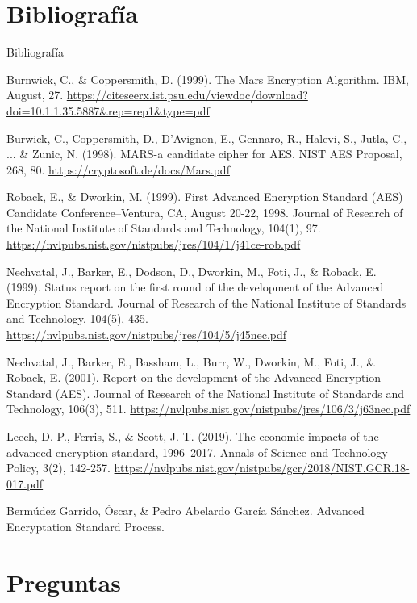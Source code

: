 \documentclass{beamer}
\begin{document}
\section{Bibliografía}
\begin{frame}[allowframebreaks]{Bibliografía}

\scriptsize
\begin{thebibliography}{9}


	Burnwick, C., \& Coppersmith, D. (1999). The Mars Encryption Algorithm. IBM, August, 27. \url{https://citeseerx.ist.psu.edu/viewdoc/download?doi=10.1.1.35.5887&rep=rep1&type=pdf}


	Burwick, C., Coppersmith, D., D’Avignon, E., Gennaro, R., Halevi, S., Jutla, C., ... \& Zunic, N. (1998). MARS-a candidate cipher for AES. NIST AES Proposal, 268, 80. \url{https://cryptosoft.de/docs/Mars.pdf}


	Roback, E., \& Dworkin, M. (1999). First Advanced Encryption Standard (AES) Candidate Conference--Ventura, CA, August 20-22, 1998. Journal of Research of the National Institute of Standards and Technology, 104(1), 97. \url{https://nvlpubs.nist.gov/nistpubs/jres/104/1/j41ce-rob.pdf}


	Nechvatal, J., Barker, E., Dodson, D., Dworkin, M., Foti, J., \& Roback, E. (1999). Status report on the first round of the development of the Advanced Encryption Standard. Journal of Research of the National Institute of Standards and Technology, 104(5), 435. \url{https://nvlpubs.nist.gov/nistpubs/jres/104/5/j45nec.pdf}


	Nechvatal, J., Barker, E., Bassham, L., Burr, W., Dworkin, M., Foti, J., \& Roback, E. (2001). Report on the development of the Advanced Encryption Standard (AES). Journal of Research of the National Institute of Standards and Technology, 106(3), 511. \url{https://nvlpubs.nist.gov/nistpubs/jres/106/3/j63nec.pdf}


	Leech, D. P., Ferris, S., \& Scott, J. T. (2019). The economic impacts of the advanced encryption standard, 1996–2017. Annals of Science and Technology Policy, 3(2), 142-257. \url{https://nvlpubs.nist.gov/nistpubs/gcr/2018/NIST.GCR.18-017.pdf}



	Bermúdez Garrido, Óscar, \& Pedro Abelardo García Sánchez. Advanced Encryptation Standard Process.

\end{thebibliography}


\end{frame}

\section{Preguntas}
\end{document}
